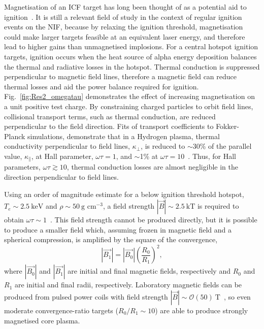 Magnetisation of an \ac{ICF} target has long been thought of as a potential aid to ignition~\cite{lindemuth_parameter_1983,jones_physics_1986}.
It is still a relevant field of study in the context of regular ignition events on the \ac{NIF}, because by relaxing the ignition threshold, magnetisation could make larger targets feasible at an equivalent laser energy, and therefore lead to higher gains than unmagnetised implosions.
For a central hotspot ignition targets, ignition occurs when the heat source of alpha energy deposition balances the thermal and radiative losses in the hotspot.
Thermal conduction is suppressed perpendicular to magnetic field lines, therefore a magnetic field can reduce thermal losses and aid the power balance required for ignition.
Fig.~\ref{fig:Res2_omegatau} demonstrates the effect of increasing magnetisation on a unit positive test charge.
By constraining charged particles to orbit field lines, collisional transport terms, such as thermal conduction, are reduced perpendicular to the field direction.
Fits of transport coefficients to Fokker-Planck simulations, demonstrate that in a Hydrogen plasma, thermal conductivity perpendicular to field lines, $\kappa_{\perp}$, is reduced to $\sim$30\% of the parallel value, $\kappa_{\parallel}$, at Hall parameter, $\omega\tau=1$, and $\sim$1\% at $\omega\tau=10$~\cite{epperlein_plasma_1986}.
Thus, for Hall parameters, $\omega\tau\gtrsim 10$, thermal conduction losses are almost negligible in the direction perpendicular to field lines.

Using an order of magnitude estimate for a below ignition threshold hotspot, $T_e\sim 2.5\ \text{keV}$ and $\rho\sim50\ \text{g cm}^{-3}$, a field strength $|\vec{B}|\sim 2.5\ \text{kT}$ is required to obtain $\omega\tau\sim1$~\cite{oneill_modelling_2023}.
This field strength cannot be produced directly, but it is possible to produce a smaller field which, assuming frozen in magnetic field and a spherical compression, is amplified by the square of the convergence,
\begin{equation}
    \label{eq:Res2_flux_compression}
    |\vec{B_1}|=|\vec{B_0}| \left(\frac{R_0}{R_1}\right)^2,
\end{equation}
where $|\vec{B_0}|$ and $|\vec{B_1}|$ are initial and final magnetic fields, respectively and $R_0$ and $R_1$ are initial and final radii, respectively.
Laboratory magnetic fields can be produced from pulsed power coils with field strength $|\vec{B}|\sim\mathcal{O}(50)\ \text{T}$~\cite{fiksel_note_2015}, so even moderate convergence-ratio targets ($R_0/R_1\sim10$) are able to produce strongly magnetised core plasma.

